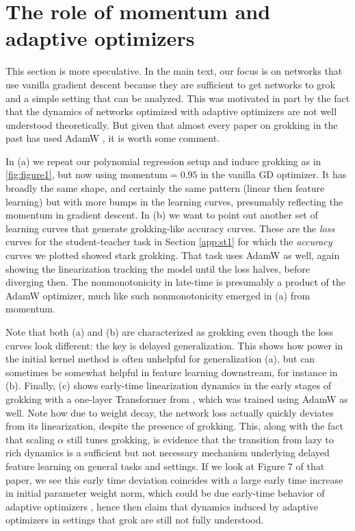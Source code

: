 \documentclass{article} %
\begin{document}
\color{black}
\section{The role of momentum and adaptive optimizers}\label{app:optimizers}

This section is more speculative. In the main text, our focus is on networks that use vanilla gradient descent because they are sufficient to get networks to grok and a simple setting that can be analyzed. This was motivated in part by the fact that the dynamics of networks optimized with adaptive optimizers are not well understood theoretically. But given that almost every paper on grokking in the past has used AdamW \citep{power2022grokking, nanda2023progress, liu2022omnigrok, liu2022towards, varma2023explaining}, it is worth some comment. 

In (a) we repeat our polynomial regression setup and induce grokking as in \ref{fig:figure1}, but now using $\text{momentum}=0.95$ in the vanilla GD optimizer. It has broadly the same shape, and certainly the same pattern (linear then feature learning) but with more bumps in the learning curves, presumably reflecting the momentum in gradient descent. In (b) we want to point out another set of learning curves that generate grokking-like accuracy curves. These are the \textit{loss} curves for the student-teacher task in Section \ref{app:st1} for which the \textit{accuracy} curves we plotted showed stark grokking. That task uses AdamW as well, again showing the linearization tracking the model until the loss halves, before diverging then. The nonmonotonicity in late-time is presumably a product of the AdamW optimizer, much like such nonmonotonicity emerged in (a) from momentum. 

Note that both (a) and (b) are characterized as grokking even though the loss curves look different: the key is delayed generalization. This shows how power in the initial kernel method is often unhelpful for generalization (a), but can sometimes be somewhat helpful in feature learning downstream, for instance in (b). Finally, (c) shows early-time linearization dynamics in the early stages of grokking with a one-layer Transformer from \cite{nanda2023progress}, which was trained using AdamW as well. Note how due to weight decay, the network loss actually quickly deviates from its linearization, despite the presence of grokking. This, along with the fact that scaling $\alpha$ still tunes grokking, is evidence that the transition from lazy to rich dynamics is a sufficient but not necessary mechanism underlying delayed feature learning on general tasks and settings. If we look at Figure 7 of that paper, we see this early time deviation coincides with a large early time increase in initial parameter weight norm, which could be due early-time behavior of adaptive optimizers \cite{lewkowycz2020training, cohen2021gradient, thilak2022slingshot}, hence then claim that dynamics induced by adaptive optimizers in settings that grok are still not fully understood. 
\end{document}
